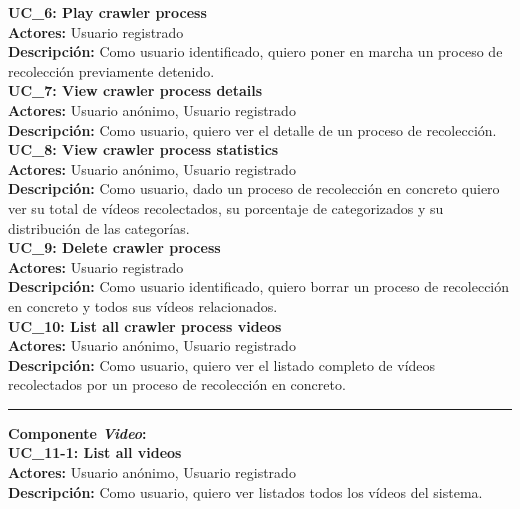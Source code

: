 \documentclass[11pt,a4paper]{article}
\begin{document}
\noindent\textbf{UC\_6: Play crawler process}\\
\textbf{Actores:} Usuario registrado\\
\textbf{Descripción:} Como usuario identificado, quiero poner en marcha un proceso de recolección previamente detenido.
\\

\noindent\textbf{UC\_7: View crawler process details}\\
\textbf{Actores:} Usuario anónimo, Usuario registrado\\
\textbf{Descripción:} Como usuario, quiero ver el detalle de un proceso de recolección.
\\

\noindent\textbf{UC\_8: View crawler process statistics}\\
\textbf{Actores:} Usuario anónimo, Usuario registrado\\
\textbf{Descripción:} Como usuario, dado un proceso de recolección en concreto quiero ver su total de vídeos recolectados, su porcentaje de categorizados y su distribución de las categorías.
\\

\noindent\textbf{UC\_9: Delete crawler process}\\
\textbf{Actores:} Usuario registrado\\
\textbf{Descripción:} Como usuario identificado, quiero borrar un proceso de recolección en concreto y todos sus vídeos relacionados.
\\

\noindent\textbf{UC\_10: List all crawler process videos}\\
\textbf{Actores:} Usuario anónimo, Usuario registrado\\
\textbf{Descripción:} Como usuario, quiero ver el listado completo de vídeos recolectados por un proceso de recolección en concreto.
\\

\begin{center}\rule{10cm}{0.4pt}\end{center}

\noindent\textbf{Componente \textit{Video}:}
\\

\noindent\textbf{UC\_11-1: List all videos}\\
\textbf{Actores:} Usuario anónimo, Usuario registrado\\
\textbf{Descripción:} Como usuario, quiero ver listados todos los vídeos del sistema.
\\
\end{document}

